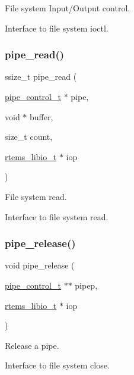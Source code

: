 File system Input/\+Output control. 

Interface to file system ioctl. \mbox{\label{group__FIFO__PIPE_gafac00fefe4986e2357ffdd01a20b6f2e}} 
\subsubsection{\texorpdfstring{pipe\_read()}{pipe\_read()}}
{\footnotesize\ttfamily ssize\+\_\+t pipe\+\_\+read (\begin{DoxyParamCaption}\item[{\mbox{\hyperlink{structpipe__control}{pipe\+\_\+control\+\_\+t}} $\ast$}]{pipe,  }\item[{void $\ast$}]{buffer,  }\item[{size\+\_\+t}]{count,  }\item[{\mbox{\hyperlink{structrtems__libio__tt}{rtems\+\_\+libio\+\_\+t}} $\ast$}]{iop }\end{DoxyParamCaption})}



File system read. 

Interface to file system read. \mbox{\label{group__FIFO__PIPE_gaeaf913514f36620744271f4c5581d29b}} 
\subsubsection{\texorpdfstring{pipe\_release()}{pipe\_release()}}
{\footnotesize\ttfamily void pipe\+\_\+release (\begin{DoxyParamCaption}\item[{\mbox{\hyperlink{structpipe__control}{pipe\+\_\+control\+\_\+t}} $\ast$$\ast$}]{pipep,  }\item[{\mbox{\hyperlink{structrtems__libio__tt}{rtems\+\_\+libio\+\_\+t}} $\ast$}]{iop }\end{DoxyParamCaption})}



Release a pipe. 

Interface to file system close.

